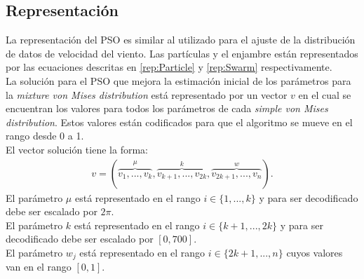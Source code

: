 \subsection{Representación}\label{sec:Representacion}
La representación del PSO es similar al utilizado para el ajuste de la distribución de datos de velocidad del viento. Las partículas y el enjambre están representados por las ecuaciones descritas en \ref{rep:Particle} y \ref{rep:Swarm} respectivamente.\\
La solución para el PSO que mejora la estimación inicial de los parámetros para la \emph{mixture von Mises distribution} está representado por un vector $v$ en el cual se encuentran los valores para todos los parámetros de cada \emph{simple von Mises distribution}. Estos valores están codificados para que el algoritmo se mueve en el rango desde 0 a 1.\\
El vector solución tiene la forma:
\begin{align}
    v = (\overbrace{v_1,...,v_k}^{\mu},\overbrace{v_{k+1},...,v_{2k}}^{k},\overbrace{v_{2k+1},...,v_{n}}^{w}).
\end{align}
El parámetro $\mu$ está representado en el rango $i \in \{1,...,k\}$ y para ser decodificado debe ser escalado por $2\pi$.\\
El parámetro $k$ está representado en el rango $i \in \{k+1,...,2k\}$ y para ser decodificado debe ser escalado por $[0, 700]$.\\
El parámetro $w_j$ está representado en el rango $i \in \{2k+1,...,n\}$ cuyos valores van en el rango $[0,1]$.


